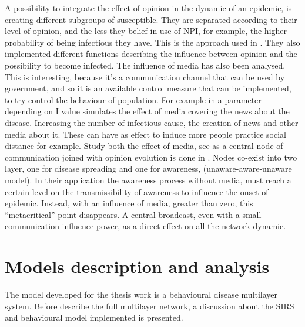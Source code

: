 A possibility to integrate the effect of opinion in the dynamic of an epidemic, is creating different subgroups of susceptible. They are separated according to their level of opinion, and the less they belief in use of NPI, for example, the higher probability of being infectious they have. This is the approach used in \cite{Tyson_2020}. They also implemented different functions describing the influence between opinion and the possibility to become infected. 
The influence of media has also been analysed. This is interesting, because it’s a communication channel that can be used by government, and so it is an available control measure that can be implemented, to try control the behaviour of population.  For example in \cite{Collinson2014} a parameter depending on I value simulates the effect of media covering the news about the disease. Increasing the number of infectious cause, the creation of news and other media about it. These can have as effect to induce more people practice social distance for example. Study both the effect of media, see as a central node of communication joined with opinion evolution is done in \cite{Granell_2014}. Nodes co-exist into two layer, one for disease spreading and one for awareness, (unaware-aware-unaware model). In their application the awareness process without media, must reach a certain level on the transmissibility of awareness to influence the onset of epidemic. Instead, with an influence of media, greater than zero, this “metacritical” point disappears. A central broadcast, even with a small communication influence power, as a direct effect on all the network dynamic. 




\chapter{Models description and analysis}
The model developed for the thesis work is a behavioural disease multilayer system. Before describe the full multilayer network, a discussion about the SIRS and behavioural model implemented is presented.

